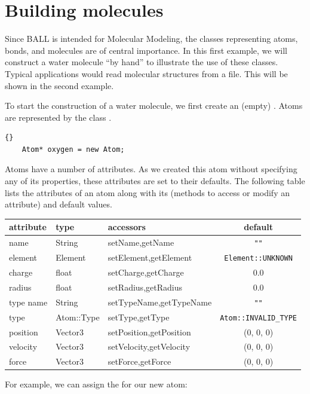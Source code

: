 \section{Building molecules}

Since BALL is intended for Molecular Modeling, the classes representing atoms,
bonds, and molecules are of central importance. In this first example, we will
construct a water molecule ``by hand'' to illustrate the use of these classes.
Typical applications would read molecular structures from a file. This will be
shown in the second example.

\noindent
To start the construction of a water molecule, we first create an (empty)
. Atoms are represented by the class .

\begin{lstlisting}{}
	Atom* oxygen = new Atom;
\end{lstlisting}
	
\noindent
Atoms have a number of attributes. As we created this atom without specifying
any of its properties, these attributes are set to their defaults. The
following table lists the attributes of an atom along with its
 (methods to access or modify an attribute) and default
values.
\begin{center}
	\begin{tabular}{lllc}
	attribute		&	type				& accessors     						& default\\
	\hline
	name				& String			& setName,getName						& {\tt ""}\\
	element			& Element			& setElement,getElement			& {\tt Element::UNKNOWN}\\
	charge			& float				& setCharge,getCharge				& 0.0\\
	radius			& float				& setRadius,getRadius				& 0.0\\
	type name   & String			& setTypeName,getTypeName		& {\tt ""}\\
	type        & Atom::Type	& setType,getType						& {\tt Atom::INVALID\_TYPE}\\
	position    & Vector3			& setPosition,getPosition		& (0, 0, 0)\\
	velocity    & Vector3			& setVelocity,getVelocity		& (0, 0, 0)\\
	force		    & Vector3			& setForce,getForce					& (0, 0, 0)
	\end{tabular}
\end{center}

\noindent
For example, we can assign the  for our new atom:

